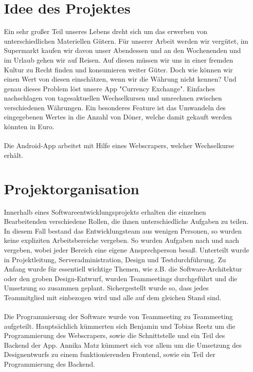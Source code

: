 \documentclass[conference]{IEEEtran}
\begin{document}
\section{Idee des Projektes}
Ein sehr großer Teil unseres Lebens dreht sich um das erwerben von unterschiedlichen Materiellen Gütern. Für unserer Arbeit werden wir vergütet, im Supermarkt kaufen wir davon unser Abendessen und an den Wochenenden und im Urlaub gehen wir auf Reisen. Auf diesen müssen wir uns in einer fremden Kultur zu Recht finden und konsumieren weiter Güter. Doch wie können wir einen Wert von diesen einschätzen, wenn wir die Währung nicht kennen? Und genau dieses Problem löst unsere App "Currency Exchange". Einfaches nachschlagen von tagesaktuellen Wechselkursen und umrechnen zwischen verschiedenen Währungen. Ein besonderes Feature ist das Umwandeln des eingegebenen Wertes in die Anzahl von Döner, welche damit gekauft werden könnten in Euro. \\\\
Die  Android-App arbeitet mit Hilfe eines Webscrapers, welcher Wechselkurse erhält.

\section{Projektorganisation}
Innerhalb eines Softwareentwicklungsprojekts erhalten die einzelnen Bearbeitenden verschiedene Rollen, die ihnen unterschiedliche Aufgaben zu teilen. In diesem Fall bestand das Entwicklungsteam aus wenigen Personen, so wurden keine expliziten Arbeitsbereiche vergeben.  So wurden Aufgaben nach und nach vergeben, wobei jeder Bereich eine eigene Ansprechperson besaß. Unterteilt wurde in Projektleitung, Serveradministration, Design und Testdurchführung. Zu Anfang wurde für essentiell wichtige Themen, wie z.B. die Software-Architektur oder den groben Design-Entwurf, wurden Teammeetings durchgeführt und die Umsetzung so zusammen geplant. Sichergestellt wurde so, dass jedes Teammitglied mit einbezogen wird und alle auf dem gleichen Stand sind. \\\\
Die Programmierung der Software wurde von Teammeeting zu Teammeeting aufgeteilt. Hauptsächlich kümmerten sich Benjamin und Tobias Reetz um die Programmierung des Webscrapers, sowie die Schnittstelle und ein Teil des Backend der App. Annika Matz kümmert sich vor allem um die Umsetzung des Designentwurfs zu einem funktionierenden Frontend, sowie ein Teil der Programmierung des Backend.
\end{document}
